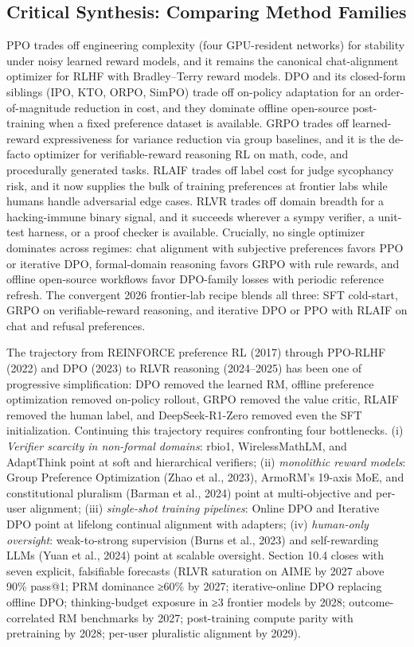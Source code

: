 \subsection{Critical Synthesis: Comparing Method Families}\label{critical-synthesis-comparing-method-families}

PPO trades off engineering complexity (four GPU-resident networks) for stability under noisy learned reward models, and it remains the canonical chat-alignment optimizer for RLHF with Bradley--Terry reward models. DPO and its closed-form siblings (IPO, KTO, ORPO, SimPO) trade off on-policy adaptation for an order-of-magnitude reduction in cost, and they dominate offline open-source post-training when a fixed preference dataset is available. GRPO trades off learned-reward expressiveness for variance reduction via group baselines, and it is the de-facto optimizer for verifiable-reward reasoning RL on math, code, and procedurally generated tasks. RLAIF trades off label cost for judge sycophancy risk, and it now supplies the bulk of training preferences at frontier labs while humans handle adversarial edge cases. RLVR trades off domain breadth for a hacking-immune binary signal, and it succeeds wherever a sympy verifier, a unit-test harness, or a proof checker is available. Crucially, no single optimizer dominates across regimes: chat alignment with subjective preferences favors PPO or iterative DPO, formal-domain reasoning favors GRPO with rule rewards, and offline open-source workflows favor DPO-family losses with periodic reference refresh. The convergent 2026 frontier-lab recipe blends all three: SFT cold-start, GRPO on verifiable-reward reasoning, and iterative DPO or PPO with RLAIF on chat and refusal preferences.

The trajectory from REINFORCE preference RL (2017) through PPO-RLHF (2022) and DPO (2023) to RLVR reasoning (2024--2025) has been one of progressive simplification: DPO removed the learned RM, offline preference optimization removed on-policy rollout, GRPO removed the value critic, RLAIF removed the human label, and DeepSeek-R1-Zero removed even the SFT initialization. Continuing this trajectory requires confronting four bottlenecks. (i) \emph{Verifier scarcity in non-formal domains}: rbio1, WirelessMathLM, and AdaptThink point at soft and hierarchical verifiers; (ii) \emph{monolithic reward models}: Group Preference Optimization (Zhao et al., 2023), ArmoRM's 19-axis MoE, and constitutional pluralism (Barman et al., 2024) point at multi-objective and per-user alignment; (iii) \emph{single-shot training pipelines}: Online DPO and Iterative DPO point at lifelong continual alignment with adapters; (iv) \emph{human-only oversight}: weak-to-strong supervision (Burns et al., 2023) and self-rewarding LLMs (Yuan et al., 2024) point at scalable oversight. Section 10.4 closes with seven explicit, falsifiable forecasts (RLVR saturation on AIME by 2027 above 90\% pass@1; PRM dominance ≥60\% by 2027; iterative-online DPO replacing offline DPO; thinking-budget exposure in ≥3 frontier models by 2028; outcome-correlated RM benchmarks by 2027; post-training compute parity with pretraining by 2028; per-user pluralistic alignment by 2029).

